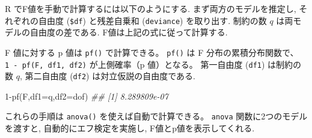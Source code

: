 \documentclass[
  letterpaper,
  xelatex,
  ja=standard, xelatex]{bxjsbook}
\newenvironment{Shaded}{\begin{snugshade}}{\end{snugshade}}
\newcommand{\AttributeTok}[1]{\textcolor[rgb]{0.40,0.45,0.13}{#1}}
\newcommand{\DecValTok}[1]{\textcolor[rgb]{0.68,0.00,0.00}{#1}}
\newcommand{\DocumentationTok}[1]{\textcolor[rgb]{0.37,0.37,0.37}{\textit{#1}}}
\newcommand{\FunctionTok}[1]{\textcolor[rgb]{0.28,0.35,0.67}{#1}}
\newcommand{\NormalTok}[1]{\textcolor[rgb]{0.00,0.23,0.31}{#1}}
\newcommand{\OtherTok}[1]{\textcolor[rgb]{0.00,0.23,0.31}{#1}}
\newcommand{\SpecialCharTok}[1]{\textcolor[rgb]{0.37,0.37,0.37}{#1}}
\begin{document}
R でF値を手動で計算するには以下のようにする. まず両方のモデルを推定し,
それぞれの自由度 (\texttt{\$df}) と残差自乗和 (\texttt{deviance})
を取り出す. 制約の数 \(q\) は両モデルの自由度の差である.
F値は上記の式に従って計算する.

\begin{Shaded}
\end{Shaded}

F 値に対する p 値は \texttt{pf()} で計算できる。 \texttt{pf()} は F
分布の累積分布関数で、\texttt{1\ -\ pf(F,\ df1,\ df2)} が上側確率（p
値）となる。 第一自由度 (\texttt{df1}) は制約の数 \(q\), 第二自由度
(\texttt{df2}) は対立仮説の自由度である.

\begin{Shaded}
\begin{Highlighting}[]
\DecValTok{1}\SpecialCharTok{{-}}\FunctionTok{pf}\NormalTok{(F,}\AttributeTok{df1=}\NormalTok{q,}\AttributeTok{df2=}\NormalTok{dof)}
\DocumentationTok{\#\# [1] 8.289809e{-}07}
\end{Highlighting}
\end{Shaded}

これらの手順は \texttt{anova()} を使えば自動で計算できる。
\texttt{anova} 関数に2つのモデルを渡すと, 自動的にエフ検定を実施し,
F値とp値を表示してくれる.
\end{document}
